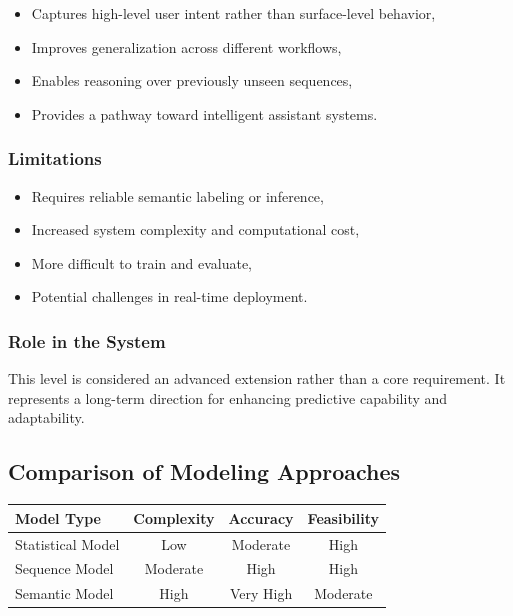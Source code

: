 \documentclass[11pt]{article}
\begin{document}
\begin{itemize}
\item Captures high-level user intent rather than surface-level behavior,
\item Improves generalization across different workflows,
\item Enables reasoning over previously unseen sequences,
\item Provides a pathway toward intelligent assistant systems.
\end{itemize}

\subsubsection{Limitations}

\begin{itemize}
\item Requires reliable semantic labeling or inference,
\item Increased system complexity and computational cost,
\item More difficult to train and evaluate,
\item Potential challenges in real-time deployment.
\end{itemize}

\subsubsection{Role in the System}

This level is considered an advanced extension rather than a core requirement. It represents a long-term direction for enhancing predictive capability and adaptability.

\subsection{Comparison of Modeling Approaches}

\begin{center}
\begin{tabular}{lccc}
\hline
Model Type & Complexity & Accuracy & Feasibility \\
\hline
Statistical Model & Low & Moderate & High \\
Sequence Model & Moderate & High & High \\
Semantic Model & High & Very High & Moderate \\
\hline
\end{tabular}
\end{center}
\end{document}
